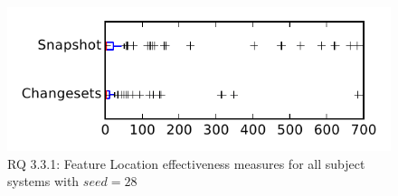 
\begin{figure}
\centering
\includegraphics[height=0.4\textheight]{figures/flt_seed/rq1_tiny_28}
\caption{RQ 3.3.1: Feature Location effectiveness measures for all subject systems with $seed=28$}
\label{fig:flt_seed:rq1:tiny}
\end{figure}
